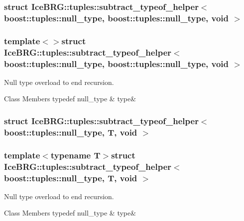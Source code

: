 \subsubsection{struct Ice\+B\+R\+G\+:\+:tuples\+:\+:subtract\+\_\+typeof\+\_\+helper$<$ boost\+:\+:tuples\+:\+:null\+\_\+type, boost\+:\+:tuples\+:\+:null\+\_\+type, void $>$}
\subsubsection*{template$<$$>$struct Ice\+B\+R\+G\+::tuples\+::subtract\+\_\+typeof\+\_\+helper$<$ boost\+::tuples\+::null\+\_\+type, boost\+::tuples\+::null\+\_\+type, void $>$}

Null type overload to end recursion. \begin{DoxyFields}{Class Members}
\hypertarget{namespaceIceBRG_1_1tuples_a57bea50e4b845e4dc575c3f382d6a774}{}typedef null\+\_\+type\label{namespaceIceBRG_1_1tuples_a57bea50e4b845e4dc575c3f382d6a774}
&
type&
\\
\hline

\end{DoxyFields}
\label{structIceBRG_1_1tuples_1_1subtract__typeof__helper_3_01boost_1_1tuples_1_1null__type_00_01T_00_01void_01_4}
\hypertarget{namespaceIceBRG_1_1tuples_structIceBRG_1_1tuples_1_1subtract__typeof__helper_3_01boost_1_1tuples_1_1null__type_00_01T_00_01void_01_4}{}
\subsubsection{struct Ice\+B\+R\+G\+:\+:tuples\+:\+:subtract\+\_\+typeof\+\_\+helper$<$ boost\+:\+:tuples\+:\+:null\+\_\+type, T, void $>$}
\subsubsection*{template$<$typename T$>$struct Ice\+B\+R\+G\+::tuples\+::subtract\+\_\+typeof\+\_\+helper$<$ boost\+::tuples\+::null\+\_\+type, T, void $>$}

Null type overload to end recursion. \begin{DoxyFields}{Class Members}
\hypertarget{namespaceIceBRG_1_1tuples_af35e1afe4efe44b31e066cecedb2f275}{}typedef null\+\_\+type\label{namespaceIceBRG_1_1tuples_af35e1afe4efe44b31e066cecedb2f275}
&
type&
\\
\hline

\end{DoxyFields}
\label{structIceBRG_1_1tuples_1_1subtract__typeof__helper_3_01T_00_01boost_1_1tuples_1_1null__type_00_01void_01_4}
\hypertarget{namespaceIceBRG_1_1tuples_structIceBRG_1_1tuples_1_1subtract__typeof__helper_3_01T_00_01boost_1_1tuples_1_1null__type_00_01void_01_4}{}
